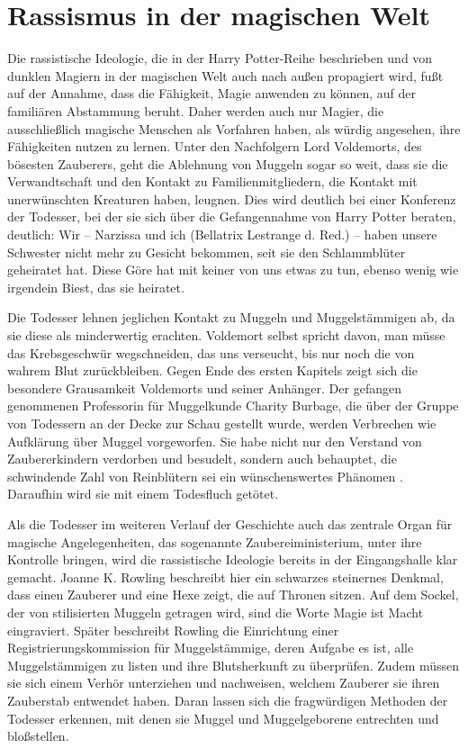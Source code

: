 \section{Rassismus in der magischen Welt}
Die rassistische Ideologie, die in der \glqq Harry Potter\grqq-Reihe beschrieben und von dunklen Magiern in der magischen Welt auch nach außen propagiert wird, fußt auf der Annahme, dass die Fähigkeit, Magie anwenden zu können, auf der familiären Abstammung beruht.
Daher werden auch nur Magier, die ausschließlich magische Menschen als Vorfahren haben, als würdig angesehen, ihre Fähigkeiten nutzen zu lernen.
Unter den Nachfolgern Lord Voldemorts, des bösesten Zauberers, geht die Ablehnung von Muggeln sogar so weit, dass sie die Verwandtschaft und den Kontakt zu Familienmitgliedern, die Kontakt mit \glqq unerwünschten\grqq{} Kreaturen haben, leugnen.
Dies wird deutlich bei einer Konferenz der Todesser, bei der sie sich über die Gefangennahme von Harry Potter beraten, deutlich: \glqq Wir – Narzissa und ich (Bellatrix Lestrange d. Red.) – haben unsere Schwester nicht mehr zu Gesicht bekommen, seit sie den Schlammblüter geheiratet hat. Diese Göre hat mit keiner von uns etwas zu tun, ebenso wenig wie irgendein Biest, das sie heiratet.\grqq{}\cite[S.\,18]{JKR10}

Die Todesser lehnen jeglichen Kontakt zu Muggeln und Muggelstämmigen ab, da sie diese als minderwertig erachten.
Voldemort selbst spricht davon, man müsse \glqq das Krebsgeschwür wegschneiden, das uns verseucht, bis nur noch die von wahrem Blut zurückbleiben.\grqq{}\cite[S.\,19]{JKR10} 
Gegen Ende des ersten Kapitels zeigt sich die besondere Grausamkeit Voldemorts und seiner Anhänger. 
Der gefangen genommenen Professorin für \glqq Muggelkunde\grqq{} Charity Burbage, die über der Gruppe von Todessern an der Decke zur Schau gestellt wurde, werden \glqq Verbrechen\grqq{} wie Aufklärung über Muggel vorgeworfen. 
Sie habe nicht nur \glqq den Verstand von Zaubererkindern\grqq{} verdorben und besudelt, sondern auch behauptet, die schwindende Zahl von Reinblütern sei ein \glqq wünschenswertes Phänomen\grqq{} \cite[S.\,19]{JKR10}. 
Daraufhin wird sie mit einem Todesfluch getötet.

Als die Todesser im weiteren Verlauf der Geschichte auch das zentrale Organ für magische Angelegenheiten, das sogenannte Zaubereiministerium, unter ihre Kontrolle bringen, wird die rassistische Ideologie bereits in der Eingangshalle klar gemacht.
Joanne K. Rowling beschreibt hier ein schwarzes steinernes Denkmal, dass einen Zauberer und eine Hexe zeigt, die auf Thronen sitzen.\cite[S.\,249]{JKR10} 
Auf dem Sockel, der von stilisierten Muggeln getragen wird, sind die Worte \glqq Magie ist Macht\grqq{} eingraviert. 
Später beschreibt Rowling die Einrichtung einer \glqq Registrierungskommission für Muggelstämmige\grqq , deren Aufgabe es ist, alle Muggelstämmigen zu listen und ihre Blutsherkunft zu überprüfen. 
Zudem müssen sie sich einem Verhör unterziehen und nachweisen, welchem Zauberer sie ihren Zauberstab entwendet haben\cite [S.\,268]{JKR10}. 
Daran lassen sich die fragwürdigen Methoden der Todesser erkennen, mit denen sie Muggel und Muggelgeborene entrechten und bloßstellen. 

